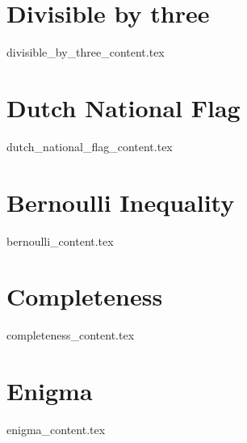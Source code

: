 \documentclass[justified, openany]{tufte-book}
\theoremstyle{plain}%
\theoremstyle{definition}
\theoremstyle{remark}
\begin{document}
\clearpage
\chapter{Divisible by three}
{divisible_by_three_content.tex}

\clearpage
\chapter{Dutch National Flag}
{dutch_national_flag_content.tex}

\clearpage
\chapter{Bernoulli Inequality}
{bernoulli_content.tex}

\clearpage
\chapter{Completeness}
{completeness_content.tex}

\clearpage
\chapter{Enigma}
{enigma_content.tex}

\begin{fullwidth}


\end{fullwidth}

\printindex

\listoftodos
\end{document}
